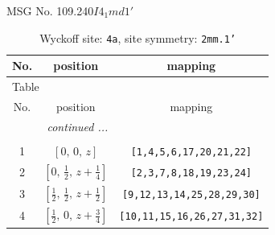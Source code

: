 \documentclass[fleqn,8pt]{jsarticle}
\begin{document}
\setcounter{MaxMatrixCols}{32}

\renewcommand{\tablename}{Table~}
\renewcommand{\figurename}{Figure~}
\begin{center}
\LARGE
MSG No. 109.240\quad$I4_{1}md1'$
\end{center}
\renewcommand{\arraystretch}{1.2}
\begin{longtable}{ccc}
\caption{Wyckoff site: {\tt 4a}, site symmetry: {\tt 2mm.1'}}
 \\
 \hline \hline
No. & position & mapping \\ \hline \endfirsthead

\multicolumn{2}{l}{\tablename\ \thetable{}} \\
 \hline \hline
No. & position & mapping \\ \hline \endhead

 \hline \hline
\multicolumn{2}{r}{\footnotesize\it continued ...} \\ \endfoot

 \hline \hline
\multicolumn{2}{r}{} \\ \endlastfoot

1 & $\left[ 0,\, 0,\, z \right]$ & {\tt [1,4,5,6,17,20,21,22]} \\ \hline
2 & $\left[ 0,\, \frac{1}{2},\, z + \frac{1}{4} \right]$ & {\tt [2,3,7,8,18,19,23,24]} \\ \hline
3 & $\left[ \frac{1}{2},\, \frac{1}{2},\, z + \frac{1}{2} \right]$ & {\tt [9,12,13,14,25,28,29,30]} \\ \hline
4 & $\left[ \frac{1}{2},\, 0,\, z + \frac{3}{4} \right]$ & {\tt [10,11,15,16,26,27,31,32]} \\
\end{longtable}
\renewcommand{\arraystretch}{1.2}
\end{document}
